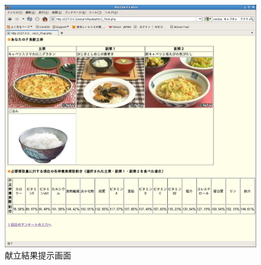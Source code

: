 \documentclass[11pt,titlepage,uplatex]{ujreport}
\begin{document}
\begin{figure}[tbh]
  \centering
\includegraphics[scale=0.3]{dinner.pdf}
\caption{献立結果提示画面}
\label{献立}
\end{figure}
\end{document}
